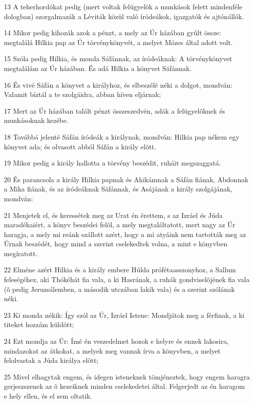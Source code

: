 \par 13 A teherhordókat pedig (mert voltak felügyelõk a munkások felett mindenféle dologban) szorgalmazák a Léviták közül való íródeákok, igazgatók és ajtónállók.
\par 14 Mikor pedig kihozák azok a pénzt, a mely az Úr házában gyûlt össze: megtalálá Hilkia pap az Úr törvénykönyvét, a melyet Mózes által adott volt.
\par 15 Szóla pedig Hilkia, és monda Sáfánnak, az íródeáknak: A törvénykönyvet megtalálám az Úr házában. És adá Hilkia a könyvet Sáfánnak.
\par 16 És vivé Sáfán a könyvet a királyhoz, és elbeszélé néki a dolgot, mondván: Valamit bíztál a te szolgáidra, abban híven eljárnak;
\par 17 Mert az Úr házában talált pénzt összeszedvén, adák a felügyelõknek és munkásoknak kezébe.
\par 18 Továbbá jelenté Sáfán íródeák a királynak, mondván: Hilkia pap nékem egy könyvet ada; és olvasott abból Sáfán a király elõtt.
\par 19 Mikor pedig a király hallotta a törvény beszédit, ruháit megszaggatá.
\par 20 És parancsola a király Hilkia papnak és Ahikámnak a Sáfán fiának, Abdonnak a Mika fiának, és az íródeáknak Sáfánnak, és Asájának a király szolgájának, mondván:
\par 21 Menjetek el, és keressétek meg az Urat én érettem, s az Izráel és Júda maradékaiért, a könyv beszédei felõl, a mely megtaláltatott, mert nagy az Úr haragja, a mely mi reánk szállott azért, hogy a mi atyáink nem tartották meg az Úrnak beszédét, hogy mind a szerint cselekedtek volna, a mint e könyvben megíratott.
\par 22 Elméne azért Hilkia és a király embere Húlda prófétaasszonyhoz, a Sallum feleségéhez, aki Thókéhát fia vala, a ki Hasrának, a ruhák gondviselõjének fia vala (õ pedig Jeruzsálemben, a második utczában lakik vala) és a szerint szólának néki.
\par 23 Ki monda nékik: Így szól az Úr, Izráel Istene: Mondjátok meg a férfinak, a ki titeket hozzám küldött;
\par 24 Ezt mondja az Úr: Ímé én veszedelmet hozok e helyre és ennek lakosira, mindazokat az átkokat, a melyek meg vannak írva a könyvben, a melyet felolvastak a Júda királya elõtt;
\par 25 Mivel elhagytak engem, és idegen isteneknek tömjéneztek, hogy engem haragra gerjeszszenek az õ kezeiknek minden cselekedetei által. Felgerjedt az én haragom e hely ellen, és el sem oltatik.
